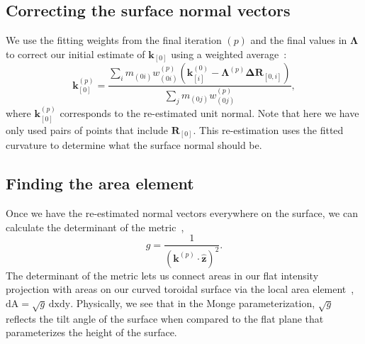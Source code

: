 \subsection{Correcting the surface normal vectors}
We use the fitting weights from the final iteration $(p)$ and the final values in $\bm{\Lambda}$ to correct our initial estimate of $\mathbf{k}_{[0]}$ using a weighted average~\cite{RN31}:
\begin{equation}
\mathbf{k}_{[0]}^{(p)} = \frac{\sum\limits_i m_{(0i)}w_{(0i)}^{(p)}(\mathbf{k}_{[i]}^{(0)} - \mathbf{\Lambda}^{(p)}\mathbf{\Delta R}_{[0,i]})}{\sum\limits_j m_{(0j)}w_{(0j)}^{(p)}},
\end{equation}
where $\mathbf{k}_{[0]}^{(p)}$ corresponds to the re-estimated unit normal.
Note that here we have only used pairs of points that include $\mathbf{R}_{[0]}$.
This re-estimation uses the fitted curvature to determine what the surface normal should be.


\subsection{Finding the area element}
Once we have the re-estimated normal vectors everywhere on the surface, we can calculate the determinant of the metric~\cite{RN35},
\begin{equation}
g = \frac{1}{(\mathbf{k}^{(p)} \cdot \mathbf{\hat{z}})^2}.
\end{equation}
The determinant of the metric lets us connect areas in our flat intensity projection with areas on our curved toroidal surface via the local area element~\cite{RN35}, $\textrm{dA} = \sqrt{g} \, \textrm{dx}\textrm{dy}$.
Physically, we see that in the Monge parameterization, $\sqrt{g}$ reflects the tilt angle of the surface when compared to the flat plane that parameterizes the height of the surface.


